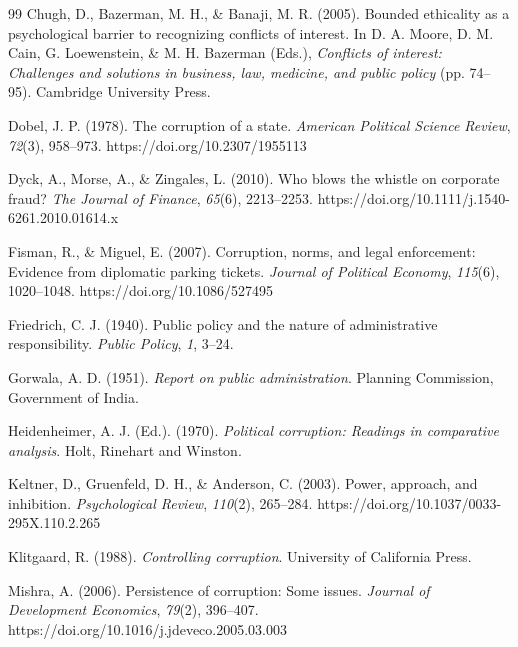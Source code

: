 \documentclass[11pt, a4paper]{article}
\begin{document}
\begin{thebibliography}{99}
Chugh, D., Bazerman, M. H., \& Banaji, M. R. (2005).
\newblock Bounded ethicality as a psychological barrier to recognizing conflicts of interest.
\newblock In D. A. Moore, D. M. Cain, G. Loewenstein, \& M. H. Bazerman (Eds.), \emph{Conflicts of interest: Challenges and solutions in business, law, medicine, and public policy} (pp. 74--95). Cambridge University Press.

Dobel, J. P. (1978).
\newblock The corruption of a state.
\newblock \emph{American Political Science Review}, \emph{72}(3), 958--973.
\newblock https://doi.org/10.2307/1955113

Dyck, A., Morse, A., \& Zingales, L. (2010).
\newblock Who blows the whistle on corporate fraud?
\newblock \emph{The Journal of Finance}, \emph{65}(6), 2213--2253.
\newblock https://doi.org/10.1111/j.1540-6261.2010.01614.x

Fisman, R., \& Miguel, E. (2007).
\newblock Corruption, norms, and legal enforcement: Evidence from diplomatic parking tickets.
\newblock \emph{Journal of Political Economy}, \emph{115}(6), 1020--1048.
\newblock https://doi.org/10.1086/527495

Friedrich, C. J. (1940).
\newblock Public policy and the nature of administrative responsibility.
\newblock \emph{Public Policy}, \emph{1}, 3--24.

Gorwala, A. D. (1951).
\newblock \emph{Report on public administration}.
\newblock Planning Commission, Government of India.

Heidenheimer, A. J. (Ed.). (1970).
\newblock \emph{Political corruption: Readings in comparative analysis}.
\newblock Holt, Rinehart and Winston.

Keltner, D., Gruenfeld, D. H., \& Anderson, C. (2003).
\newblock Power, approach, and inhibition.
\newblock \emph{Psychological Review}, \emph{110}(2), 265--284.
\newblock https://doi.org/10.1037/0033-295X.110.2.265

Klitgaard, R. (1988).
\newblock \emph{Controlling corruption}.
\newblock University of California Press.

Mishra, A. (2006).
\newblock Persistence of corruption: Some issues.
\newblock \emph{Journal of Development Economics}, \emph{79}(2), 396--407.
\newblock https://doi.org/10.1016/j.jdeveco.2005.03.003


\end{thebibliography}
\end{document}
